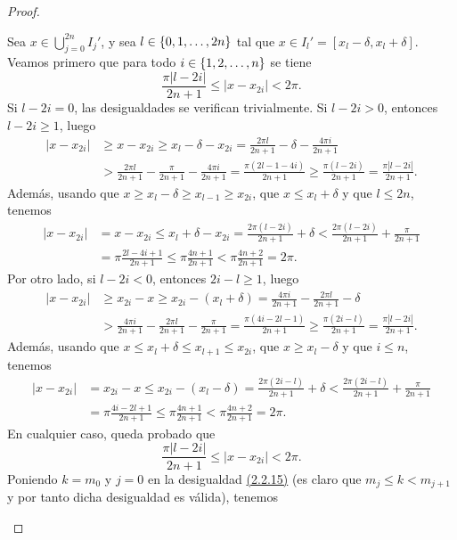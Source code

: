 \documentclass[a4paper, 12pt]{book}
\begin{document}
\begin{proof}
\begin{itemize}
        Sea $x \in \bigcup_{j=0}^{2n}I_j'$, y sea $l \in \{0,1,\mathellipsis,2n\}$ tal que $x \in I_l' = [x_l-\delta,x_l+\delta]$. Veamos primero que para todo $i \in \{1,2,\mathellipsis,n\}$ se tiene
        \[\frac{\pi |l -2i|}{2n+1} \leq |x-x_{2i}| < 2\pi .\]
        Si $l -2i = 0$, las desigualdades se verifican trivialmente. Si $l - 2i > 0$, entonces $l - 2i \geq 1$, luego
        \begin{align*}
            |x-x_{2i}| &\geq x-x_{2i} \geq x_l-\delta-x_{2i} = \frac{2\pi l}{2n+1}-\delta-\frac{4\pi i}{2n+1} \\ &> \frac{2\pi l}{2n+1}-\frac{\pi}{2n+1}-\frac{4\pi i}{2n+1}
            = \frac{\pi(2l-1-4i)}{2n+1} \geq \frac{\pi(l-2i)}{2n+1} = \frac{\pi|l-2i|}{2n+1}.
        \end{align*}
        Además, usando que $x \geq x_l-\delta \geq x_{l-1} \geq x_{2i}$, que $x \leq x_l+\delta$ y que $l \leq 2n$, tenemos
        \begin{align*}
            |x-x_{2i}| &= x-x_{2i} \leq x_l+\delta-x_{2i} = \frac{2\pi(l-2i)}{2n+1}+\delta < \frac{2\pi(l-2i)}{2n+1}+\frac{\pi}{2n+1} \\
            &= \pi\frac{2l-4i+1}{2n+1} \leq \pi\frac{4n+1}{2n+1} < \pi\frac{4n+2}{2n+1} = 2\pi.
        \end{align*}
        Por otro lado, si $l - 2i < 0$, entonces $2i - l \geq 1$, luego
        \begin{align*}
            |x-x_{2i}| &\geq x_{2i}-x \geq x_{2i} - (x_l+\delta) = \frac{4\pi i}{2n+1} - \frac{2\pi l}{2n+1} - \delta \\ &>\frac{4\pi i}{2n+1} - \frac{2\pi l}{2n+1} -\frac{\pi}{2n+1}
            = \frac{\pi(4i-2l-1)}{2n+1} \geq \frac{\pi(2i-l)}{2n+1} = \frac{\pi|l-2i|}{2n+1}.
        \end{align*}
        Además, usando que $x \leq x_l+\delta \leq x_{l+1} \leq x_{2i}$, que $x \geq x_l-\delta$ y que $i \leq n$, tenemos
        \begin{align*}
            |x-x_{2i}| &= x_{2i}-x \leq x_{2i}-(x_l-\delta) = \frac{2\pi(2i-l)}{2n+1}+\delta < \frac{2\pi(2i-l)}{2n+1}+\frac{\pi}{2n+1} \\
            &= \pi\frac{4i-2l+1}{2n+1} \leq \pi\frac{4n+1}{2n+1} < \pi\frac{4n+2}{2n+1} = 2\pi.
        \end{align*}
        En cualquier caso, queda probado que
        \[\frac{\pi |l -2i|}{2n+1} \leq |x-x_{2i}| < 2\pi .\]
        Poniendo $k = m_0$ y $j = 0$ en la desigualdad \hyperref[2.2.15]{(2.2.15)} (es claro que $m_j \leq k < m_{j+1}$ y por tanto dicha desigualdad es válida), tenemos

\end{itemize}
\end{proof}
\end{document}
